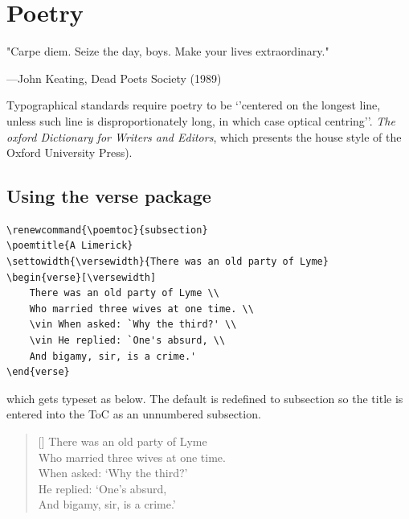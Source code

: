 \chapter{Poetry}

\epigraph{"Carpe diem. Seize the day, boys. Make your lives extraordinary."}{---John Keating, Dead Poets Society (1989)}

\newcommand{\garden}{
I used to love my garden \\
But now my love is dead \\
For I found a bachelor's button \\
In black-eyed Susan's bed.
}
Typographical standards require poetry to be `'centered on the longest line, unless such line is disproportionately long, in which case optical centring''. \textit{The oxford Dictionary for Writers and Editors}, which presents the house style of
the Oxford University Press). 


\section{Using the verse package}



\begin{lstlisting}[language={[common]TeX},% 
                           alsolanguage={[LaTeX]TeX},% 
                           alsolanguage={[primitive]TeX},%
                           alsolanguage={extras}]
\renewcommand{\poemtoc}{subsection}
\poemtitle{A Limerick}
\settowidth{\versewidth}{There was an old party of Lyme}
\begin{verse}[\versewidth]
    There was an old party of Lyme \\
    Who married three wives at one time. \\
    \vin When asked: `Why the third?' \\
    \vin He replied: `One's absurd, \\
    And bigamy, sir, is a crime.'
\end{verse}
\end{lstlisting}


which gets typeset as below. The default   is redefined to subsection so
the title is entered into the ToC as an unnumbered subsection.

\newlength{\aaaa}
\settowidth{\aaaa}{ZZZZ}

\renewcommand{\poemtoc}{subsection}
\settowidth{\versewidth}{There was an old party of Lyme}
\begin{verse}[\versewidth]
    There was an old party of Lyme \\
     Who married three wives at one time. \\
    \vin When asked: `Why the third?' \\
    \ZZZZ He replied: `One's absurd, \\
And bigamy, sir, is a crime.'
\end{verse}

